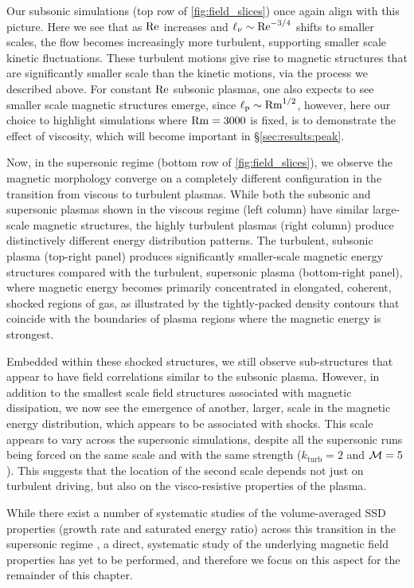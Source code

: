Our subsonic simulations (\eg top row of \autoref{fig:field_slices}) once again align with this picture. Here we see that as $\mathrm{Re}$ increases and $\ell_\nu \sim \mathrm{Re}^{-3/4}$ shifts to smaller scales, the flow becomes increasingly more turbulent, supporting smaller scale kinetic fluctuations. These turbulent motions give rise to magnetic structures that are significantly smaller scale than the kinetic motions, via the process we described above. For constant $\mathrm{Re}$ subsonic plasmas, one also expects to see smaller scale magnetic structures emerge, since $\ell_\mathrm{p} \sim \mathrm{Rm}^{1/2}$, however, here our choice to highlight simulations where $\mathrm{Rm} = 3000$ is fixed, is to demonstrate the effect of viscosity, which will become important in \S\ref{sec:results:peak}.

Now, in the supersonic regime (bottom row of \autoref{fig:field_slices}), we observe the magnetic morphology converge on a completely different configuration in the transition from viscous to turbulent plasmas. While both the subsonic and supersonic plasmas shown in the viscous regime (left column) have similar large-scale magnetic structures, the highly turbulent plasmas (right column) produce distinctively different energy distribution patterns. The turbulent, subsonic plasma (top-right panel) produces significantly smaller-scale magnetic energy structures compared with the turbulent, supersonic plasma (bottom-right panel), where magnetic energy becomes primarily concentrated in elongated, coherent, shocked regions of gas, as illustrated by the tightly-packed density contours that coincide with the boundaries of plasma regions where the magnetic energy is strongest.

Embedded within these shocked structures, we still observe sub-structures that appear to have field correlations similar to the subsonic plasma. However, in addition to the smallest scale field structures associated with magnetic dissipation, we now see the emergence of another, larger, scale in the magnetic energy distribution, which appears to be associated with shocks. This scale appears to vary across the supersonic simulations, despite all the supersonic runs being forced on the same scale and with the same strength ($k_\mathrm{turb} = 2$ and $\mathcal{M} = 5$). This suggests that the location of the second scale depends not just on turbulent driving, but also on the visco-resistive properties of the plasma.

While there exist a number of systematic studies of the volume-averaged SSD properties (\eg growth rate and saturated energy ratio) across this transition in the supersonic regime \citep[see for example][]{federrath2011mach, chirakkara2021efficient}, a direct, systematic study of the underlying magnetic field properties has yet to be performed, and therefore we focus on this aspect for the remainder of this chapter.

